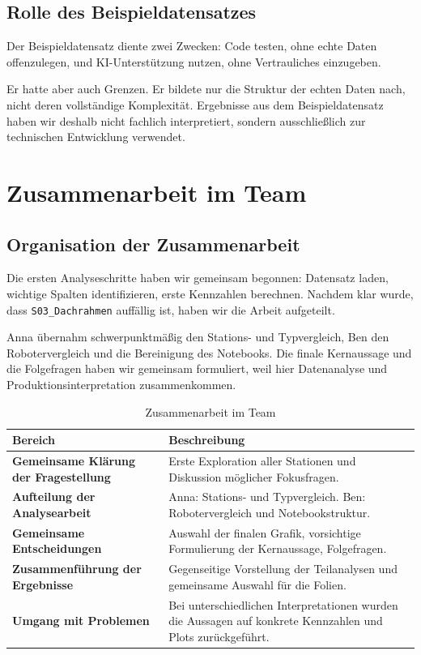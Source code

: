\documentclass[a4paper, 11pt]{article}
\begin{document}
\subsection{Rolle des Beispieldatensatzes}

Der Beispieldatensatz diente zwei Zwecken: Code testen, ohne echte Daten offenzulegen, und KI-Unterstützung nutzen, ohne Vertrauliches einzugeben.

Er hatte aber auch Grenzen. Er bildete nur die Struktur der echten Daten nach, nicht deren vollständige Komplexität. Ergebnisse aus dem Beispieldatensatz haben wir deshalb nicht fachlich interpretiert, sondern ausschließlich zur technischen Entwicklung verwendet.

\section{Zusammenarbeit im Team}

\subsection{Organisation der Zusammenarbeit}

Die ersten Analyseschritte haben wir gemeinsam begonnen: Datensatz laden, wichtige Spalten identifizieren, erste Kennzahlen berechnen. Nachdem klar wurde, dass \texttt{S03\_Dachrahmen} auffällig ist, haben wir die Arbeit aufgeteilt.

Anna übernahm schwerpunktmäßig den Stations- und Typvergleich, Ben den Robotervergleich und die Bereinigung des Notebooks. Die finale Kernaussage und die Folgefragen haben wir gemeinsam formuliert, weil hier Datenanalyse und Produktionsinterpretation zusammenkommen.

\begin{table}[htbp]
\centering
\caption{Zusammenarbeit im Team}
\begin{tabular}{p{4.0cm}p{10.4cm}}
\hline
\textbf{Bereich} & \textbf{Beschreibung} \\
\hline
\textbf{Gemeinsame Klärung der Fragestellung} & Erste Exploration aller Stationen und Diskussion möglicher Fokusfragen. \\
\textbf{Aufteilung der Analysearbeit} & Anna: Stations- und Typvergleich. Ben: Robotervergleich und Notebookstruktur. \\
\textbf{Gemeinsame Entscheidungen} & Auswahl der finalen Grafik, vorsichtige Formulierung der Kernaussage, Folgefragen. \\
\textbf{Zusammenführung der Ergebnisse} & Gegenseitige Vorstellung der Teilanalysen und gemeinsame Auswahl für die Folien. \\
\textbf{Umgang mit Problemen} & Bei unterschiedlichen Interpretationen wurden die Aussagen auf konkrete Kennzahlen und Plots zurückgeführt. \\
\hline
\end{tabular}
\end{table}
\end{document}
